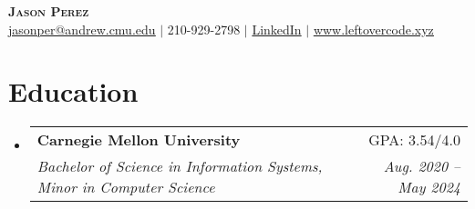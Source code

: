 \documentclass[letterpaper,11pt]{article}
\makeatletter
\newcommand{\resumeSubheading}[4]{
  \vspace{-2pt}\item
    \begin{tabular*}{0.97\textwidth}[t]{l@{\extracolsep{\fill}}r}
      \textbf{#1} & #2 \\
      \textit{\small#3} & \textit{\small #4} \\
    \end{tabular*}\vspace{-7pt}
}
\newcommand{\resumeSubHeadingListStart}{\begin{itemize}[leftmargin=0.15in, label={}]}
\newcommand{\resumeSubHeadingListEnd}{\end{itemize}}
\makeatother
\begin{document}

\begin{center}
    \textbf{\Huge \scshape Jason Perez} \\ \vspace{1pt}
    \href{mailto:jasonper@andrew.cmu.edu}{\underline{jasonper@andrew.cmu.edu}} $|$ 
    \small 210-929-2798 $|$
    \href{https://www.linkedin.com/in/jason-perez-a494731b1}{LinkedIn} $|$
    \href{https://www.leftovercode.xyz}{\underline{www.leftovercode.xyz}}
\end{center}


\section{Education}
    \resumeSubHeadingListStart
        \resumeSubheading
        {Carnegie Mellon University}{GPA: 3.54/4.0}
        {Bachelor of Science in Information Systems, Minor in Computer Science}{Aug. 2020 -- May 2024}
    \resumeSubHeadingListEnd


\end{document}
